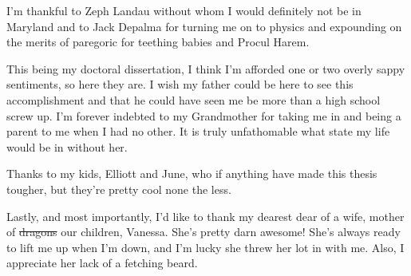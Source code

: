 I'm thankful to Zeph Landau without whom I would definitely not be in Maryland and to Jack Depalma for turning me on to physics and expounding on the merits of paregoric for teething babies and Procul Harem.

This being my doctoral dissertation, I think I'm afforded one or two overly sappy sentiments, so here they are. I wish my father could be here to see this accomplishment and that he could have seen me be more than a high school screw up. I'm forever indebted to my Grandmother for taking me in and being a parent to me when I had no other. It is truly unfathomable what state my life would be in without her. 

Thanks to my kids,  Elliott and June, who if anything have made this thesis tougher,  but they're pretty cool none the less. 

Lastly, and most importantly, I'd like to thank my dearest dear of a wife, mother of \sout{dragons} our children, Vanessa. She's pretty darn awesome! She's always ready to lift me up when I'm down, and I'm lucky she threw her lot in with me. Also, I appreciate her lack of a fetching beard. 

